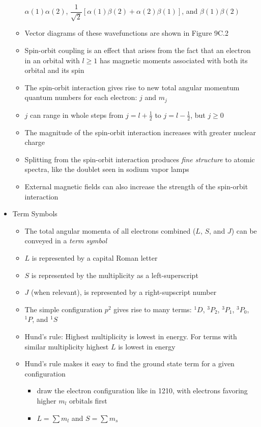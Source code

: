 \documentclass[12pt, openany, letterpaper]{memoir}
\begin{document}
\begin{itemize}
\begin{itemize}
		$\alpha(1)\alpha(2)$, $\dfrac{1}{\sqrt{2}}\left[\alpha(1)\beta(2) + \alpha(2)\beta(1)\right]$, and $\beta(1)\beta(2)$
		\item Vector diagrams of these wavefunctions are shown in Figure 9C.2
		\item Spin-orbit coupling is an effect that arises from the fact that an electron in an orbital with $l\geq 1$ has magnetic moments associated with both its orbital and its spin
		\item The spin-orbit interaction gives rise to new total angular momentum quantum numbers for each electron: $j$ and $m_j$
		\item $j$ can range in whole steps from $j=l+\frac{1}{2}$ to $j=l-\frac{1}{2}$, but $j\geq0$
		\item The magnitude of the spin-orbit interaction increases with greater nuclear charge
		\item Splitting from the spin-orbit interaction produces \emph{fine structure} to atomic spectra, like the doublet seen in sodium vapor lamps
		\item External magnetic fields can also increase the strength of the spin-orbit interaction
	\end{itemize}
	\item Term Symbols
	\begin{itemize}
		\item The total angular momenta of all electrons combined ($L$, $S$, and $J$) can be conveyed in a \emph {term symbol}
		\item $L$ is represented by a capital Roman letter
		\item $S$ is represented by the multiplicity as a left-superscript
		\item $J$ (when relevant), is represented by a right-supscript number
		\item The simple configuration $p^2$ gives rise to many terms: $^1D$, $^3P_2$, $^3P_1$, $^3P_0$, $^1P$, and $^1S$
		\item Hund's rule: Highest multiplicity is lowest in energy. For terms with similar multiplicity highest $L$ is lowest in energy		
		\item Hund's rule makes it easy to find the ground state term for a given configuration
		\begin{itemize}
			\item draw the electron configuration like in 1210, with electrons favoring higher $m_l$ orbitals first
			\item $L=\sum m_l$ and $S = \sum m_s$ 
		\end{itemize}

\end{itemize}
\end{itemize}
\end{document}
